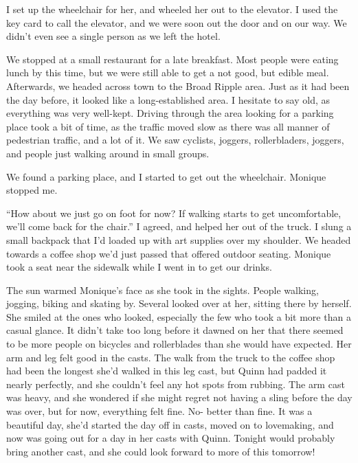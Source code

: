 I set up the wheelchair for her, and wheeled her out to the elevator. I used the key card
to call the elevator, and we were soon out the door and on our way. We didn't even see a single
person as we left the hotel.

We stopped at a small restaurant for a late breakfast. Most people were eating lunch by
this time, but we were still able to get a not good, but edible meal. Afterwards, we headed
across town to the Broad Ripple area. Just as it had been the day before, it looked like a
long-established area. I hesitate to say old, as everything was very well-kept. Driving through
the area looking for a parking place took a bit of time, as the traffic moved slow as there was
all manner of pedestrian traffic, and a lot of it. We saw cyclists, joggers, rollerbladers,
joggers, and people just walking around in small groups.

We found a parking place, and I started to get out the wheelchair. Monique stopped me.

``How about we just go on foot for now? If walking starts to get uncomfortable, we'll come
back for the chair.'' I agreed, and helped her out of the truck. I slung a small backpack that
I'd loaded up with art supplies over my shoulder. We headed towards a coffee shop we'd just
passed that offered outdoor seating. Monique took a seat near the sidewalk while I went in to
get our drinks.

\begin{thought}
The sun warmed Monique's face as she took in the sights. People walking, jogging, biking
and skating by. Several looked over at her, sitting there by herself. She smiled at the ones who
looked, especially the few who took a bit more than a casual glance. It didn't take too long
before it dawned on her that there seemed to be more people on bicycles and rollerblades than
she would have expected. Her arm and leg felt good in the casts. The walk from the truck to the
coffee shop had been the longest she'd walked in this leg cast, but Quinn had padded it nearly
perfectly, and she couldn't feel any hot spots from rubbing. The arm cast was heavy, and she
wondered if she might regret not having a sling before the day was over, but for now, everything
felt fine. No- better than fine. It was a beautiful day, she'd started the day off in casts,
moved on to lovemaking, and now was going out for a day in her casts with Quinn. Tonight would
probably bring another cast, and she could look forward to more of this tomorrow!
\end{thought}

